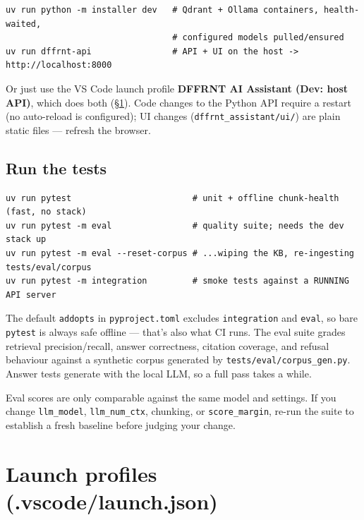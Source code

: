 \documentclass[11pt,letterpaper]{article}
\let\oldsection\section
\renewcommand{\section}{\vspace{1em}\oldsection}
\begin{document}
\begin{lstlisting}
uv run python -m installer dev   # Qdrant + Ollama containers, health-waited,
                                 # configured models pulled/ensured
uv run dffrnt-api                # API + UI on the host -> http://localhost:8000
\end{lstlisting}

Or just use the VS Code launch profile \textbf{DFFRNT AI Assistant (Dev:
host API)}, which does both (\S\ref{sec:launch}). Code changes to the
Python API require a restart (no auto-reload is configured); UI changes
(\texttt{dffrnt\_assistant/ui/}) are plain static files --- refresh the
browser.

\subsection{Run the tests}

\begin{lstlisting}
uv run pytest                        # unit + offline chunk-health (fast, no stack)
uv run pytest -m eval                # quality suite; needs the dev stack up
uv run pytest -m eval --reset-corpus # ...wiping the KB, re-ingesting tests/eval/corpus
uv run pytest -m integration         # smoke tests against a RUNNING API server
\end{lstlisting}

The default \texttt{addopts} in \texttt{pyproject.toml} excludes
\texttt{integration} and \texttt{eval}, so bare \texttt{pytest} is always
safe offline --- that's also what CI runs. The eval suite grades retrieval
precision/recall, answer correctness, citation coverage, and refusal
behaviour against a synthetic corpus generated by
\texttt{tests/eval/corpus\_gen.py}. Answer tests generate with the local
LLM, so a full pass takes a while.

\begin{gnote}
Eval scores are only comparable against the same model and settings. If you
change \texttt{llm\_model}, \texttt{llm\_num\_ctx}, chunking, or
\texttt{score\_margin}, re-run the suite to establish a fresh baseline
before judging your change.
\end{gnote}

\section{Launch profiles (.vscode/launch.json)}
\label{sec:launch}
\end{document}
